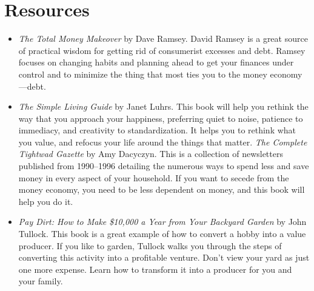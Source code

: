 \section{Resources}
\begin{itemize}
\item 
\textit{The Total Money Makeover} by Dave Ramsey.  David Ramsey is a great source of practical wisdom 
for getting rid of consumerist excesses and debt.  Ramsey focuses on changing habits and planning
ahead to get your finances under control and to minimize the thing that most ties you to the money
economy---debt.
\item
\textit{The Simple Living Guide} by Janet Luhrs.  This book will help you rethink the way that you
approach your happiness, preferring quiet to noise, patience to immediacy, and creativity to 
standardization.  It helps you to rethink what you value, and refocus your life around the things
that matter.
\textit{The Complete Tightwad Gazette} by Amy Dacyczyn.  This is a collection of newsletters 
published from 1990--1996 detailing the numerous ways to spend less and save 
money in every aspect of your household.  If you want to secede from the money economy, you
need to be less dependent on money, and this book will help you do it.
\item 
\textit{Pay Dirt: How to Make \$10,000 a Year from Your Backyard Garden} by John Tullock.
This book is a great example of how to convert a hobby into a value producer.  If you like
to garden, Tullock walks you through the steps of converting this activity into a 
profitable venture.  Don't view your yard as just one more expense.  Learn how to transform
it into a producer for you and your family.
\end{itemize}
